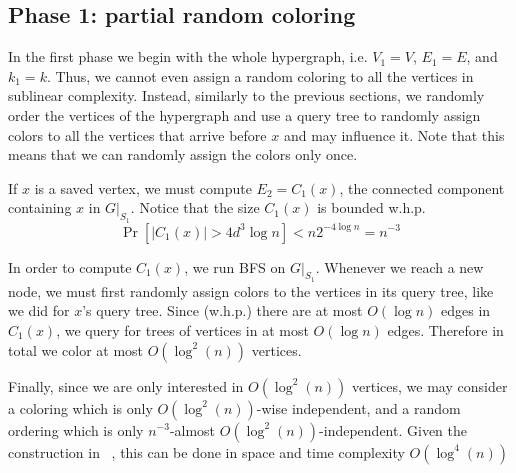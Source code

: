 \documentclass[english, oribibl]{llncs}
\begin{document}
\subsection{Phase 1: partial random coloring}
In the first phase we begin with the whole hypergraph, i.e. $V_1 = V$, $E_1 = E$, and $k_1 = k$. 
Thus, we cannot even assign a random coloring to all the vertices in sublinear complexity.
Instead, similarly to the previous sections, we randomly order the vertices of the hypergraph and use a query tree
to randomly assign colors to all the vertices that arrive before $x$ and may influence it.
Note that this means that we can randomly assign the colors only once.

If $x$ is a saved vertex, we must compute $E_2 = C_1(x)$, 
the connected component containing $x$ in $G|_{S_1}$.
Notice that the size $C_1(x)$ is bounded w.h.p.
$$\Pr\left[ |C_1(x)| > 4d^3\log n \right] < n2^{-4\log n} = n^{-3}$$

In order to compute $C_1(x)$, we run BFS on $G|_{S_1}$.
Whenever we reach a new node, we must first randomly assign colors to the vertices in its query tree,
like we did for $x$'s query tree.
Since (w.h.p.) there are at most $O(\log n)$ edges in $C_1(x)$, we query for trees of vertices in at most $O(\log n)$ edges.
Therefore in total we color at most $O\left(\log^2(n)\right)$ vertices.

Finally, since we are only interested in $O\left(\log^2(n)\right)$ vertices,
we may consider a coloring which is only $O\left(\log^2(n)\right)$-wise independent,
and a random ordering which is only $n^{-3}$-almost $O\left(\log^2(n)\right)$-independent.
Given the construction in ~\cite{ARV+11}, this can be done in space and time complexity $O\left(\log^4(n)\right)$
\end{document}
